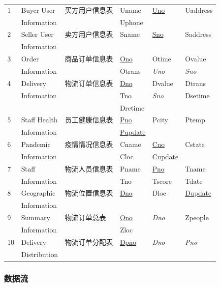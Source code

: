 \documentclass[12pt]{article}
\begin{document}
\begin{center}
\begin{supertabular}{llllll}
1 &	Buyer User &	买方用户信息表 & Uname &	\uline{Uno} &	Uaddress  \\ & Information &&	Uphone && \\
2 &	Seller User &	卖方用户信息表 & Sname &	\uline{Sno} &	Saddress \\ & Information &&&& \\
3 &	Order  & 商品订单信息表 &	\uline{Ono} &	Otime &	Ovalue  \\
& Information &&	Otrans & \textit{Uno} &	\textit{Sno}  \\
4 &	Delivery &	物流订单信息表 &	\uline{Dno} &	Dvalue &	Dtrans  \\ & Information && Tno &	\textit{Sno} & Dsetime \\ &&& Dretime && \\
5 &	Staff Health &	员工健康信息表 &	\uline{Pno} &	Pcity & Ptemp \\ 
& Information && \uline{Pupdate} && \\
6 &	Pandemic &	疫情情况信息表 &	Cname &	\uline{Cno} &	Cstate \\	& Information &&  Cloc & \uline{Cupdate}	& \\
7 &Staff  &	物流人员信息表 &	Pname &	\uline{Pno} &	Tname \\ & Information	& & Tno & Tscore & Tdate \\
8 &	Geographic  &	物流位置信息表 &	\uline{Dno} &	Dloc &	\uline{Dupdate} \\& Information&&&& \\
9 & Summary & 物流订单总表 & \uline{Ono} & \textit{Dno} & Zpeople \\ & Information && Zloc && \\
10 & Delivery & 物流订单分配表 & \uline{Dpno} & \textit{Dno} & \textit{Pno}\\ & Distribution &&&& \\
\end{supertabular}
\end{center}

\subsubsection{数据流}

\tabletail{\bottomrule}
\end{document}
